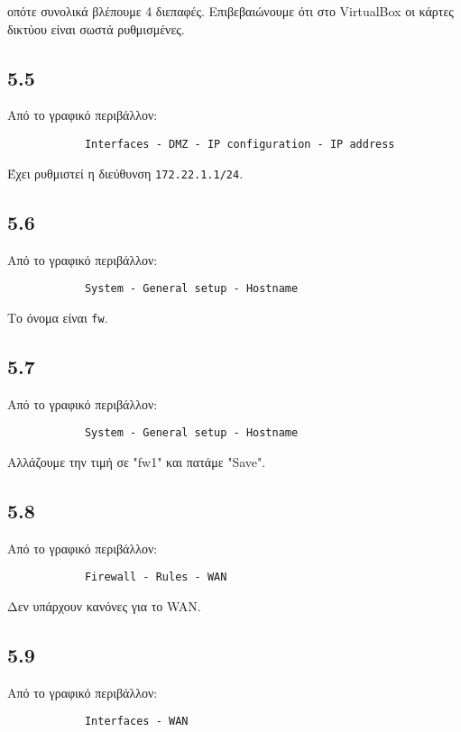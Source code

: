 \documentclass[a4paper, 12pt]{article}
\begin{document}
		οπότε συνολικά βλέπουμε 4 διεπαφές. Επιβεβαιώνουμε ότι στο VirtualBox οι κάρτες δικτύου είναι σωστά ρυθμισμένες.

	\subsection*{5.5}
		Από το γραφικό περιβάλλον:
		
		\begin{verbatim}
			Interfaces - DMZ - IP configuration - IP address
		\end{verbatim}
		
		Έχει ρυθμιστεί η διεύθυνση \verb|172.22.1.1/24|.

	\subsection*{5.6}
		Από το γραφικό περιβάλλον:
		
		\begin{verbatim}
			System - General setup - Hostname
		\end{verbatim}
		
		Το όνομα είναι \verb|fw|.

	\subsection*{5.7}
		Από το γραφικό περιβάλλον:
		
		\begin{verbatim}
			System - General setup - Hostname
		\end{verbatim}
		
		Αλλάζουμε την τιμή σε "fw1" και πατάμε "Save".

	\subsection*{5.8}
		Από το γραφικό περιβάλλον:
		
		\begin{verbatim}
			Firewall - Rules - WAN
		\end{verbatim}
		
		Δεν υπάρχουν κανόνες για το WAN.

	\subsection*{5.9}
		Από το γραφικό περιβάλλον:
		
		\begin{verbatim}
			Interfaces - WAN
		\end{verbatim}
		
\end{document}
